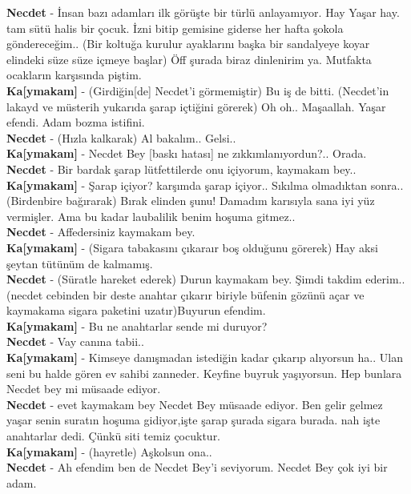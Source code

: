 \documentclass[]{book}
\begin{document}
\textbf{Necdet} - İnsan bazı adamları ilk görüşte bir türlü anlayamıyor. Hay Yaşar hay. tam sütü halis bir çocuk. İzni bitip gemisine giderse her hafta şokola göndereceğim.. (Bir koltuğa kurulur ayaklarını başka bir sandalyeye koyar elindeki süze süze içmeye başlar) Öff şurada biraz dinlenirim ya. Mutfakta ocakların karşısında piştim.\\
\textbf{Ka{[}ymakam{]}} - (Girdiğin{[}de{]} Necdet'i görmemiştir) Bu iş de bitti. (Necdet'in lakayd ve müsterih yukarıda şarap içtiğini görerek) Oh oh.. Maşaallah. Yaşar efendi. Adam bozma istifini.\\
\textbf{Necdet} - (Hızla kalkarak) Al bakalım.. Gelsi..\\
\textbf{Ka{[}ymakam{]}} - Necdet Bey {[}baskı hatası{]} ne zıkkımlanıyordun?.. Orada.\\
\textbf{Necdet} - Bir bardak şarap lütfettilerde onu içiyorum, kaymakam bey..\\
\textbf{Ka{[}ymakam{]}} - Şarap içiyor? karşımda şarap içiyor.. Sıkılma olmadıktan sonra.. (Birdenbire bağırarak) Bırak elinden şunu! Damadım karısıyla sana iyi yüz vermişler. Ama bu kadar laubalilik benim hoşuma gitmez..\\
\textbf{Necdet} - Affedersiniz kaymakam bey.\\
\textbf{Ka{[}ymakam{]}} - (Sigara tabakasını çıkaraır boş olduğunu görerek) Hay aksi şeytan tütünüm de kalmamış.\\
\textbf{Necdet} - (Süratle hareket ederek) Durun kaymakam bey. Şimdi takdim ederim.. (necdet cebinden bir deste anahtar çıkarır biriyle büfenin gözünü açar ve kaymakama sigara paketini uzatır)Buyurun efendim.\\
\textbf{Ka{[}ymakam{]}} - Bu ne anahtarlar sende mi duruyor?\\
\textbf{Necdet} - Vay canına tabii..\\
\textbf{Ka{[}ymakam{]}} - Kimseye danışmadan istediğin kadar çıkarıp alıyorsun ha.. Ulan seni bu halde gören ev sahibi zanneder. Keyfine buyruk yaşıyorsun. Hep bunlara Necdet bey mi müsaade ediyor.\\
\textbf{Necdet} - evet kaymakam bey Necdet Bey müsaade ediyor. Ben gelir gelmez yaşar senin suratın hoşuma gidiyor,işte şarap şurada sigara burada. nah işte anahtarlar dedi. Çünkü siti temiz çocuktur.\\
\textbf{Ka{[}ymakam{]}} - (hayretle) Aşkolsun ona..\\
\textbf{Necdet} - Ah efendim ben de Necdet Bey'i seviyorum. Necdet Bey çok iyi bir adam.\\
\end{document}
